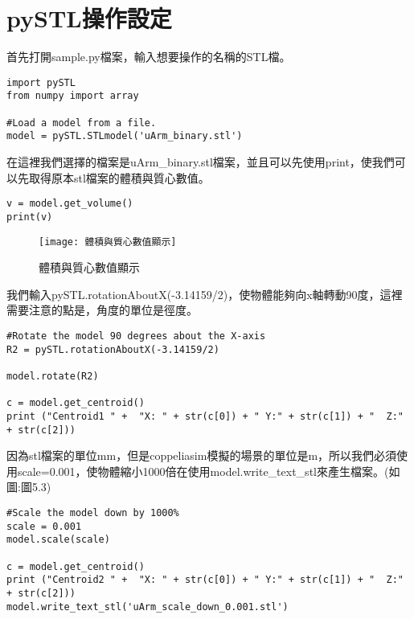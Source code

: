 \section{ pySTL操作設定}
首先打開sample.py檔案，輸入想要操作的名稱的STL檔。\\

 \begin{lstlisting}[caption=\Large 輸入名稱]
import pySTL
from numpy import array

#Load a model from a file.
model = pySTL.STLmodel('uArm_binary.stl')

\end{lstlisting}

在這裡我們選擇的檔案是uArm\_binary.stl檔案，並且可以先使用print，使我們可以先取得原本stl檔案的體積與質心數值。 \\

 \begin{lstlisting}[caption=\Large 數值]
v = model.get_volume()
print(v)

\end{lstlisting}


\begin{figure}[hbt!]
\begin{center}
\texttt{[image:  體積與質心數值顯示]}
\caption{\Large 體積與質心數值顯示}\label{ 體積與質心數值顯示}
\end{center}
\end{figure}

我們輸入pySTL.rotationAboutX(-3.14159/2)，使物體能夠向x軸轉動90度，這裡需要注意的點是，角度的單位是徑度。\\

 \begin{lstlisting}[caption=\Large 向X軸轉90度]
#Rotate the model 90 degrees about the X-axis
R2 = pySTL.rotationAboutX(-3.14159/2)

model.rotate(R2)

c = model.get_centroid()
print ("Centroid1 " +  "X: " + str(c[0]) + " Y:" + str(c[1]) + "  Z:" + str(c[2]))

\end{lstlisting}

因為stl檔案的單位mm，但是coppeliasim模擬的場景的單位是m，所以我們必須使用scale=0.001，使物體縮小1000倍在使用model.write\_text\_stl來產生檔案。(如圖:圖5.3)\\

 \begin{lstlisting}[caption=\Large 縮小1000倍]
#Scale the model down by 1000%
scale = 0.001
model.scale(scale)

c = model.get_centroid()
print ("Centroid2 " +  "X: " + str(c[0]) + " Y:" + str(c[1]) + "  Z:" + str(c[2]))
model.write_text_stl('uArm_scale_down_0.001.stl')

\end{lstlisting}

